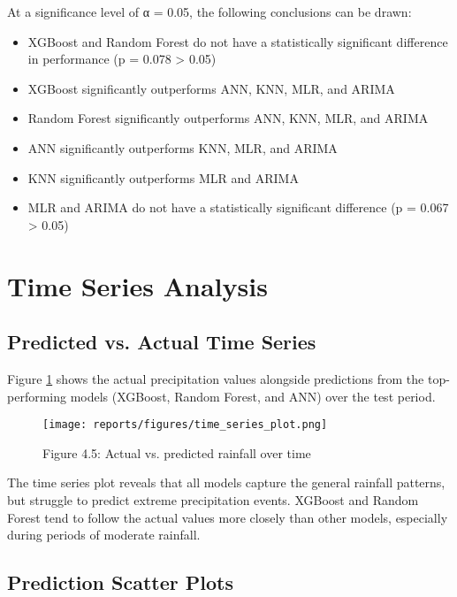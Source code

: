 \documentclass[12pt]{article}
\begin{document}
At a significance level of α = 0.05, the following conclusions can be drawn:
\begin{itemize}
    \item XGBoost and Random Forest do not have a statistically significant difference in performance (p = 0.078 > 0.05)
    \item XGBoost significantly outperforms ANN, KNN, MLR, and ARIMA
    \item Random Forest significantly outperforms ANN, KNN, MLR, and ARIMA
    \item ANN significantly outperforms KNN, MLR, and ARIMA
    \item KNN significantly outperforms MLR and ARIMA
    \item MLR and ARIMA do not have a statistically significant difference (p = 0.067 > 0.05)
\end{itemize}

\section{Time Series Analysis}
\label{sec:time_series_analysis}

\subsection{Predicted vs. Actual Time Series}
\label{subsec:time_series_comparison}

Figure \ref{fig:chap4_fig5_time_series_plot} shows the actual precipitation values alongside predictions from the top-performing models (XGBoost, Random Forest, and ANN) over the test period.

\begin{figure}[h]
\centering
\texttt{[image: reports/figures/time\_series\_plot.png]}
\caption{Figure 4.5: Actual vs. predicted rainfall over time}
\label{fig:chap4_fig5_time_series_plot}
\end{figure}

The time series plot reveals that all models capture the general rainfall patterns, but struggle to predict extreme precipitation events. XGBoost and Random Forest tend to follow the actual values more closely than other models, especially during periods of moderate rainfall.

\subsection{Prediction Scatter Plots}
\label{subsec:prediction_scatter}
\end{document}
